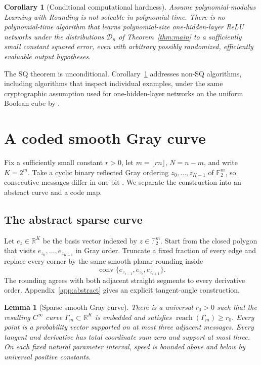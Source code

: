 \documentclass{article}
\newtheorem{lemma}[theorem]{Lemma}
\newtheorem{corollary}[theorem]{Corollary}
\theoremstyle{definition}
\theoremstyle{remark}
\newcommand{\Ftwo}{\mathbb F_2}
\newcommand{\R}{\mathbb R}
\newcommand{\cD}{\mathcal D}
\newcommand{\1}{\mathbf 1}
\newcommand{\reach}{\operatorname{reach}}
\begin{document}
\begin{corollary}[Conditional computational hardness]
\label{cor:lwr}
Assume polynomial-modulus Learning with Rounding is not solvable in polynomial time. There is no polynomial-time algorithm that learns polynomial-size one-hidden-layer ReLU networks under the distributions $\cD_n$ of Theorem~\ref{thm:main} to a sufficiently small constant squared error, even with arbitrary possibly randomized, efficiently evaluable output hypotheses.
\end{corollary}

The SQ theorem is unconditional. Corollary~\ref{cor:lwr} addresses non-SQ algorithms, including algorithms that inspect individual examples, under the same cryptographic assumption used for one-hidden-layer networks on the uniform Boolean cube by \citet{chen2022noisefree}.

\section{A coded smooth Gray curve}
\label{sec:construction}

Fix a sufficiently small constant $r>0$, let $m=\lfloor rn\rfloor$, $N=n-m$, and write $K=2^m$. Take a cyclic binary reflected Gray ordering $z_0,\ldots,z_{K-1}$ of $\Ftwo^m$, so consecutive messages differ in one bit \citep{gray1953pulse}. We separate the construction into an abstract curve and a code map.

\subsection{The abstract sparse curve}

Let $e_z\in\R^K$ be the basis vector indexed by $z\in\Ftwo^m$. Start from the closed polygon that visits $e_{z_0},\ldots,e_{z_{K-1}}$ in Gray order. Truncate a fixed fraction of every edge and replace every corner by the same smooth planar rounding inside \[ \operatorname{conv}\{e_{z_{i-1}},e_{z_i},e_{z_{i+1}}\}. \] The rounding agrees with both adjacent straight segments to every derivative order. Appendix~\ref{app:abstract} gives an explicit tangent-angle construction.

\begin{lemma}[Sparse smooth Gray curve]
\label{lem:abstract}
There is a universal $r_0>0$ such that the resulting $C^\infty$ curve $\Gamma_m\subset\R^K$ is embedded and satisfies $\reach(\Gamma_m)\geq r_0$. Every point is a probability vector supported on at most three adjacent messages. Every tangent and derivative has total coordinate sum zero and support at most three. On each fixed natural parameter interval, speed is bounded above and below by universal positive constants.
\end{lemma}
\end{document}
